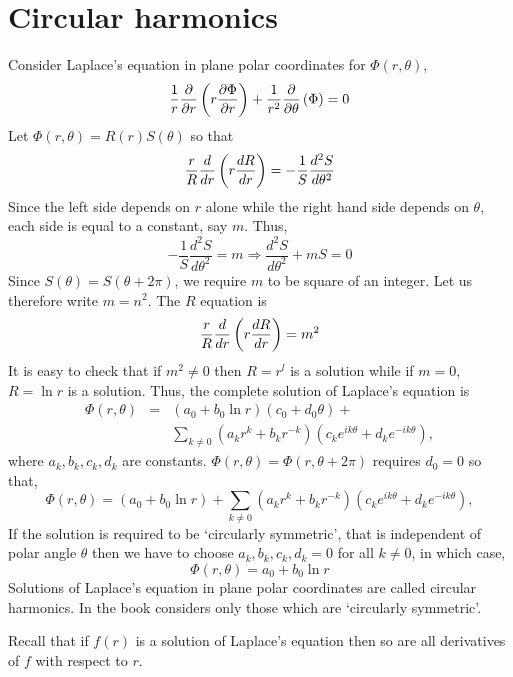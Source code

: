 \section{Circular harmonics}\label{c2sa10} 
Consider Laplace's equation in plane polar coordinates for $\Phi(r, \theta)$,
\[
\frac{1}{r}\frac{\partial}{\partial r}\left(r\frac{\partial{\Phi}}{\partial{r}}\right) + \frac{1}{r^2}\frac{\partial}{\partial{\theta}}\left({\Phi}\right) = 0
\]
Let $\Phi(r, \theta) = R(r)S(\theta)$ so that
\[
\frac{r}{R}\frac{d}{dr}\left(r\frac{d{R}}{d{r}}\right) = -\frac{1}{S}\frac{d^2S}{d\theta^2}
\]
Since the left side depends on $r$ alone while the right hand side depends on $\theta$, each side is equal to a constant, say $m$. Thus,
\[
-\frac{1}{S}\frac{d^2S}{d\theta^2} = m \Rightarrow \frac{d^2S}{d\theta^2} + mS = 0
\]
Since $S(\theta) = S(\theta + 2\pi)$, we require $m$ to be square of an integer. Let us therefore write $m = n^2$. The $R$ equation is
\[
\frac{r}{R}\frac{d}{dr}\left(r\frac{d{R}}{d{r}}\right) = m^2
\]
It is easy to check that if $m^2 \ne 0$ then $R = r^l$ is a solution while if $m = 0$, $R = \ln r$ is a solution. Thus, the complete solution of Laplace's equation is
\begin{eqnarray*}
\Phi(r, \theta) &=& (a_0 + b_0\ln r)(c_0 + d_0\theta) + \\
 & & \sum_{k \ne 0}\left(a_k r^k + b_k r^{-k}\right)\left(c_ke^{ik\theta} + d_ke^{-ik\theta}\right),
\end{eqnarray*}
where $a_k, b_k, c_k, d_k$ are constants. $\Phi(r, \theta) = \Phi(r, \theta + 2\pi)$ requires $d_0 = 0$ so that,
\[
\Phi(r, \theta) = (a_0 + b_0\ln r) + \sum_{k \ne 0}\left(a_k r^k + b_k r^{-k}\right)\left(c_ke^{ik\theta} + d_ke^{-ik\theta}\right),
\]
If the solution is required to be \enquote*{circularly symmetric}, that is independent of polar angle $\theta$ then we have to choose $a_k, b_k, c_k, d_k = 0$ for all $k \ne 0$, in
which case,
\[
\Phi(r, \theta) = a_0 + b_0\ln r
\]
Solutions of Laplace's equation in plane polar coordinates are called circular harmonics. In the book considers only those which are \enquote*{circularly symmetric}.

Recall that if $f(r)$ is a solution of Laplace's equation then so are all derivatives of $f$ with respect to $r$. 


